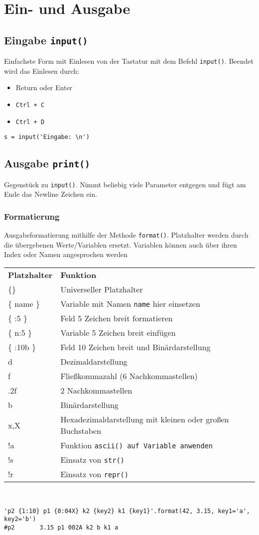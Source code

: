 \chapter{Ein- und Ausgabe}
\section{Eingabe \texttt{input()}}
Einfachste Form mit Einlesen von der Tastatur mit dem Befehl \texttt{input()}. Beendet wird das Einlesen durch:
\begin{itemize}
\item Return oder Enter
\item \texttt{Ctrl + C}
\item \texttt{Ctrl + D}
\end{itemize}
\begin{lstlisting}
s = input('Eingabe: \n')
\end{lstlisting}
\section{Ausgabe \texttt{print()}}
Gegenstück zu \texttt{input()}. Nimmt beliebig viele Parameter entgegen und fügt am Ende das Newline Zeichen ein.
\subsection{Formatierung}
Ausgabeformatierung mithilfe der Methode \texttt{format()}. Platzhalter werden durch die übergebenen Werte/Variablen ersetzt. Variablen können auch über ihren Index oder Namen angesprochen werden\\[0.5em]
\begin{tabular}{ll}
\textbf{Platzhalter}	&\textbf{Funktion}\\
\{\}			&Universeller Platzhalter\\
\{ name \}		&Variable mit Namen \texttt{name} hier einsetzen\\
\{ :5 \}		&Feld 5 Zeichen breit formatieren\\
\{ n:5 \}		&Variable 5 Zeichen breit einfügen\\
\{ :10b \}		&Feld 10 Zeichen breit und Binärdarstellung\\
d			&Dezimaldarstellung\\
f			&Fließkommazahl (6 Nachkommastellen)\\
.2f			&2 Nachkommastellen\\
b			&Binärdarstellung\\
x,X 			&Hexadezimaldarstellung mit kleinen oder großen Buchstaben\\
!a 			&Funktion \texttt{ascii() auf Variable anwenden}\\
!s			&Einsatz von \texttt{str()}\\
!r			&Einsatz von \texttt{repr()}\\
\end{tabular}
\\[0.5em]
\begin{lstlisting}
'p2 {1:10} p1 {0:04X} k2 {key2} k1 {key1}'.format(42, 3.15, key1='a', key2='b')
#p2       3.15 p1 002A k2 b k1 a
\end{lstlisting}
